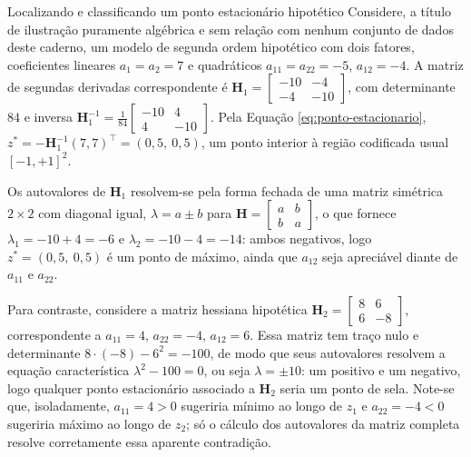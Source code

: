 \documentclass{doeapostila}
\begin{document}
\begin{aplicacao}{Localizando e classificando um ponto estacionário hipotético}
Considere, a título de ilustração puramente algébrica e sem relação com
nenhum conjunto de dados deste caderno, um modelo de segunda ordem
hipotético com dois fatores, coeficientes lineares $a_{1}=a_{2}=7$ e
quadráticos $a_{11}=a_{22}=-5$, $a_{12}=-4$. A matriz de segundas
derivadas correspondente é $\mathbf{H}_{1} =
\left[\begin{smallmatrix} -10 & -4 \\ -4 & -10 \end{smallmatrix}\right]$,
com determinante $84$ e inversa
$\mathbf{H}_{1}^{-1} = \tfrac{1}{84}\left[\begin{smallmatrix} -10 & 4 \\ 4 &
-10 \end{smallmatrix}\right]$. Pela Equação \eqref{eq:ponto-estacionario},
$z^{*} = -\mathbf{H}_{1}^{-1}(7,7)^{\top} = (0{,}5,\ 0{,}5)$, um ponto
interior à região codificada usual $[-1,+1]^{2}$.

Os autovalores de $\mathbf{H}_{1}$ resolvem-se pela forma fechada de uma
matriz simétrica $2\times2$ com diagonal igual, $\lambda = a \pm b$ para
$\mathbf{H}=\left[\begin{smallmatrix}a&b\\b&a\end{smallmatrix}\right]$, o
que fornece $\lambda_{1} = -10+4=-6$ e $\lambda_{2}=-10-4=-14$: ambos
negativos, logo $z^{*}=(0{,}5,\ 0{,}5)$ é um ponto de máximo, ainda que
$a_{12}$ seja apreciável diante de $a_{11}$ e $a_{22}$.

Para contraste, considere a matriz hessiana hipotética $\mathbf{H}_{2} =
\left[\begin{smallmatrix} 8 & 6 \\ 6 & -8 \end{smallmatrix}\right]$,
correspondente a $a_{11}=4$, $a_{22}=-4$, $a_{12}=6$. Essa matriz tem traço
nulo e determinante $8\cdot(-8)-6^{2} = -100$, de modo que seus autovalores
resolvem a equação característica $\lambda^{2} - 100 = 0$, ou seja
$\lambda = \pm10$: um positivo e um negativo, logo qualquer ponto
estacionário associado a $\mathbf{H}_{2}$ seria um ponto de sela. Note-se
que, isoladamente, $a_{11}=4>0$ sugeriria mínimo ao longo de $z_{1}$ e
$a_{22}=-4<0$ sugeriria máximo ao longo de $z_{2}$; só o cálculo dos
autovalores da matriz completa resolve corretamente essa aparente
contradição.
\end{aplicacao}
\end{document}
